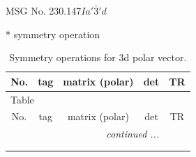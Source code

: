 \documentclass[fleqn,8pt]{jsarticle}
\begin{document}
\setcounter{MaxMatrixCols}{32}

\renewcommand{\tablename}{Table~}
\renewcommand{\figurename}{Figure~}
\begin{center}
\LARGE
MSG No. 230.147\quad$Ia'\bar{3}'d$
\end{center}
* symmetry operation
\renewcommand{\arraystretch}{1.3}
\begin{longtable}{ccccc}
\caption{Symmetry operations for 3d polar vector.}
 \\
 \hline \hline
No. & tag & matrix (polar) & det & TR \\ \hline \endfirsthead

\multicolumn{4}{l}{\tablename\ \thetable{}} \\
 \hline \hline
No. & tag & matrix (polar) & det & TR \\ \hline \endhead

 \hline \hline
\multicolumn{4}{r}{\footnotesize\it continued ...} \\ \endfoot

 \hline \hline
\multicolumn{4}{r}{} \\ \endlastfoot


\end{longtable}
\end{document}
